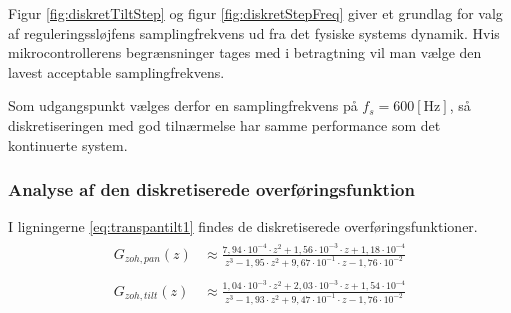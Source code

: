 Figur \ref{fig:diskretTiltStep} og figur \ref{fig:diskretStepFreq}
giver et grundlag for valg af reguleringssløjfens samplingfrekvens ud fra det fysiske systems dynamik.
Hvis mikrocontrollerens begrænsninger tages med i betragtning vil man vælge den lavest acceptable
samplingfrekvens.

Som udgangspunkt vælges derfor en samplingfrekvens på \(f_s=600 \mathrm{\left[Hz\right]}\),
så diskretiseringen med god tilnærmelse har samme performance som det kontinuerte system.

\subsubsection{Analyse af den diskretiserede overføringsfunktion}
I ligningerne \ref{eq:transpantilt1} findes de diskretiserede overføringsfunktioner.
\begin{align}
\label{eq:transpantilt1}
\begin{split}
	G_{zoh,pan}\left(z\right)&\approx\frac{7,94\cdot{}10^{-4}\cdot{}z^2
							+1,56\cdot{}10^{-3}\cdot{}z
							+1,18\cdot{}10^{-4}}
							{z^3 - 1,95\cdot{}z^2+9,67\cdot{}10^{-1}\cdot{z}-1,76\cdot{}10^{-2}}
	\\
	\\
	G_{zoh,tilt}\left(z\right)&\approx\frac{1,04\cdot{}10^{-3}\cdot{}z^2
							+2,03\cdot{}10^{-3}\cdot{}z
							+1,54\cdot{}10^{-4}}
							{z^3 - 1,93\cdot{}z^2+9,47\cdot{}10^{-1}\cdot{z}-1,76\cdot{}10^{-2}}
\end{split}
\end{align}
 
